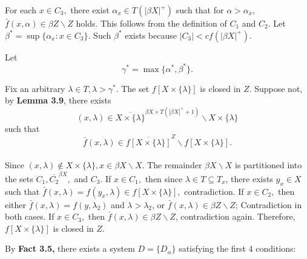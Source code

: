 \documentclass{article}
\begin{document}
\vskip 20pt


For each $x\in C_3,$ there exist $\alpha_x\in T(|\beta X|^+)$ such that for $\alpha>\alpha_x$, $\bar{f}(x,\alpha)\in \beta Z\backslash Z$ holds. This follows from the definition of $C_1$ and $C_2$. Let $\beta^*=\sup\{\alpha_x: x\in C_3\}.$ Such $\beta^*$ exists because $|C_3|<cf(|\beta X|^+).$

Let $$\gamma^*=\max\{\alpha^*, \beta^*\}.$$

\vskip 15pt
Fix an arbitrary $\lambda \in T, \lambda >\gamma^*.$
\vskip 10pt
The set $f\left[X\times \{\lambda\}\right]$ is closed in $Z$. Suppose not, by \textbf{Lemma 3.9}, there exists 
$$(x,\lambda)\in \overline{X\times \{\lambda\}}^{\beta X\times T(|\beta X|^+ +1)} \backslash X\times \{\lambda\}$$ such that $$\bar{f}(x,\lambda) \in \overline{f\left[X\times\{\lambda\}\right]}^Z \backslash f\left[X\times \{\lambda\}\right].$$ 
\\
Since $(x,\lambda)\notin X\times \{\lambda\}, x\in \beta X\backslash X.$ The remainder $\beta X\backslash X$ is partitioned into the sets $C_1, \overline{C_2}^{\beta X},$ and $C_3$. If $x\in C_1,$ then since $\lambda \in T\subseteq T_x$, there exists $y_x\in X$ such that $\bar{f}(x,\lambda)= f(y_x,\lambda) \in f\left[X\times\{\lambda\}\right],$ contradiction. If $x\in C_2,$ then either $\bar{f}(x,\lambda)=f(y,\lambda_2)$ and $\lambda>\lambda_2$, or $\bar{f}(x,\lambda)\in \beta Z\backslash Z$; Contradiction in both cases. If $x\in C_3,$ then $\bar{f}(x,\lambda)\in \beta Z\backslash Z$, contradiction again. Therefore, $f\left[X\times\{\lambda\}\right]$ is closed in $Z$.


\vskip 20pt

By \textbf{Fact 3.5,} there exists a system $D=\{D_\alpha\}$ satisfying the first 4 conditions:
\end{document}
